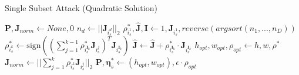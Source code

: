 \begin{algorithm}[ht]

\caption{Single Subset Attack (Quadratic Solution)}
\label{alg:single_quadratic}
\begin{algorithmic}[1]
\State $\bm{P}, \bm{J}_{norm} \gets None, 0$
			\State $n_d \gets \lvert\lvert \bm{J}_{i_s^d} \rvert\rvert_2$
		\EndFor
		\State $\rho_{i_s^1}^*, \hat{\bm{J}}, \bm{I} \gets 1, \bm{J}_{i_s^1}, reverse(argsort(n_1, ..., n_D))$
				\State $\rho_{i_s^k}^* \gets \text{sign}( (\sum_{j=1}^{k-1} \rho_{i_s^{\bm{I}_k}}^* \bm{J}_{i_s^j})^T \bm{J}_{i_s^{\bm{I}_k}} )$
				\State $\hat{\bm{J}} \gets \hat{\bm{J}} + \rho_{i_s^{\bm{I}_k}}^* \cdot \bm{J}_{i_s^{\bm{I}_k}}$
			\EndFor
		\EndIf
			\State $h_{opt}, w_{opt}, \rho_{opt} \gets h, w, \rho^*$
			\State $\bm{J}_{norm} \gets \lvert\lvert \sum_{j=1}^{k} \rho_{i_s^k}^* \bm{J}_{i_s^j} \rvert\rvert_2$
		\EndIf
	\EndFor
\EndFor
\State $\bm{P}, \bm{\eta}_s^* \gets (h_{opt}, w_{opt}), \epsilon \cdot \rho_{opt}$

\end{algorithmic}
\end{algorithm}
